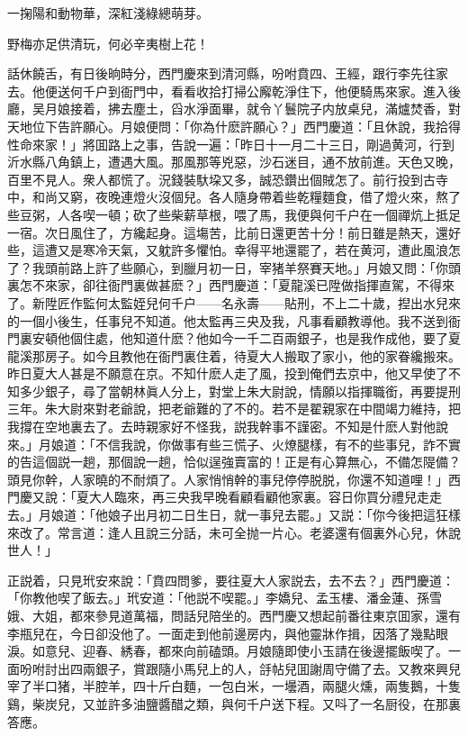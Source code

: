 一掬陽和動物華，深紅淺綠總萌芽。

野梅亦足供清玩，何必辛夷樹上花！

話休饒舌，有日後晌時分，西門慶來到清河縣，吩咐賁四、王經，跟行李先往家去。他便送何千户到衙門中，看看收拾打掃公廨乾淨住下，他便騎馬來家。進入後廳，吴月娘接着，拂去塵土，舀水淨面畢，就令丫鬟院子内放桌兒，滿爐焚香，對天地位下告許願心。月娘便問：「你為什麽許願心？」西門慶道：「且休說，我拾得性命來家！」將囬路上之事，告說一遍：「昨日十一月二十三日，剛過黄河，行到沂水縣八角鎮上，遭遇大風。那風那等兇惡，沙石迷目，通不放前進。天色又晚，百里不見人。衆人都慌了。況錢裝馱垜又多，誠恐鑽出個賊怎了。前行投到古寺中，和尚又窮，夜晚連燈火沒個兒。各人隨身帶着些乾糧麵食，借了燈火來，熬了些豆粥，人各喫一頓；砍了些柴薪草根，喂了馬，我便與何千户在一個禪炕上抵足一宿。次日風住了，方纔起身。這塲苦，比前日還更苦十分！前日雖是熱天，還好些，這遭又是寒冷天氣，又躭許多懼怕。幸得平地還罷了，若在黄河，遭此風浪怎了？我頭前路上許了些願心，到臘月初一日，宰猪羊祭賽天地。」月娘又問：「你頭裏怎不來家，卻往衙門裏做甚麽？」西門慶道：「夏龍溪已陞做指揮直駕，不得來了。新陞匠作監何太監姪兒何千户——名永壽——貼刑，不上二十歲，揑出水兒來的一個小後生，任事兒不知道。他太監再三央及我，凡事看顧教導他。我不送到衙門裏安頓他個住處，他知道什麽？他如今一千二百兩銀子，也是我作成他，要了夏龍溪那房子。如今且教他在衙門裏住着，待夏大人搬取了家小，他的家眷纔搬來。昨日夏大人甚是不願意在京。不知什麽人走了風，投到俺們去京中，他又早使了不知多少銀子，尋了當朝林眞人分上，對堂上朱大尉說，情願以指揮職銜，再要提刑三年。朱大尉來對老爺說，把老爺難的了不的。若不是翟親家在中間竭力維持，把我撐在空地裏去了。去時親家好不怪我，説我幹事不謹密。不知是什麽人對他說來。」月娘道：「不信我說，你做事有些三慌子、火燎腿樣，有不的些事兒，詐不實的告這個説一趟，那個說一趟，恰似逞強賣富的！正是有心算無心，不備怎隄備？頭見你幹，人家曉的不耐煩了。人家悄悄幹的事兒停停脱脱，你還不知道哩！」西門慶又說：「夏大人臨來，再三央我早晚看顧看顧他家裏。容日你買分禮兒走走去。」月娘道：「他娘子出月初二日生日，就一事兒去罷。」又説：「你今後把這狂樣來改了。常言道：逢人且說三分話，未可全抛一片心。老婆還有個裏外心兒，休說世人！」

正説着，只見玳安來說：「賁四問爹，要往夏大人家説去，去不去？」西門慶道：「你教他喫了飯去。」玳安道：「他説不喫罷。」李嬌兒、孟玉樓、潘金蓮、孫雪娥、大姐，都來參見道萬福，問話兒陪坐的。西門慶又想起前番往東京囬家，還有李瓶兒在，今日卻没他了。一面走到他前邊房内，與他靈牀作揖，因落了幾點眼淚。如意兒、迎春、綉春，都來向前磕頭。月娘隨即使小玉請在後邊擺飯喫了。一面吩咐討出四兩銀子，賞跟隨小馬兒上的人，㧱帖兒囬謝周守備了去。又教來興兒宰了半口猪，半腔羊，四十斤白麵，一包白米，一壜酒，兩腿火燻，兩隻鵝，十隻鷄，柴炭兒，又並許多油鹽醬醋之類，與何千户送下程。又呌了一名厨役，在那裏答應。

